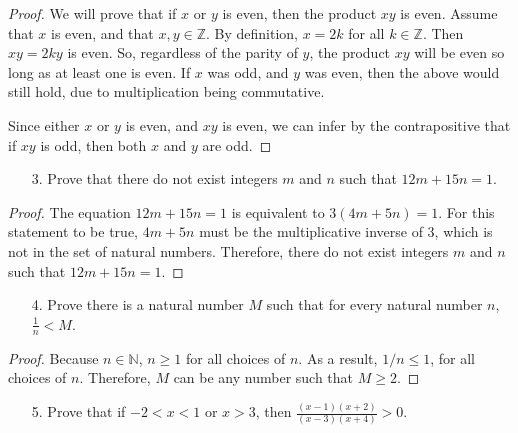 \documentclass[10pt]{article}
\theoremstyle{definition}
\theoremstyle{plain}
\newcommand{\N}{\mathbb{N}}
\newcommand{\Z}{\mathbb{Z}}
\begin{document}
\begin{proof}
  We will prove that if $x$ or $y$ is even, then the product $xy$ is even. Assume that $x$ is even, and that $x,y\in\Z$. By definition, $x=2k$ for all $k\in\Z$. Then $xy=2ky$ is even. So, regardless of the parity of $y$, the product $xy$ will be even so long as at least one is even. If $x$ was odd, and $y$ was even, then the above would still hold, due to multiplication being commutative. \\

  \par Since either $x$ or $y$ is even, and $xy$ is even, we can infer by the contrapositive that if $xy$ is odd, then both $x$ and $y$ are odd.
\end{proof}



\pagebreak



\begin{enumerate}
  \item[3.] Prove that there do not exist integers $m$ and $n$ such that $12m + 15n = 1$.
\end{enumerate}

\begin{proof}
  The equation $12m + 15n = 1$ is equivalent to $3(4m+5n)=1$. For this statement to be true, $4m+5n$ must be the multiplicative inverse of $3$, which is not in the set of natural numbers. Therefore, there do not exist integers $m$ and $n$ such that $12m + 15n = 1$.
\end{proof}



\pagebreak



\begin{enumerate}
  \item[4.] Prove there is a natural number $M$ such that for every natural number $n$, $\frac{1}{n} < M$.
\end{enumerate}

\begin{proof}
  Because $n\in\N$, $n\geq 1$ for all choices of $n$. As a result, $1/n \leq 1$, for all choices of $n$. Therefore, $M$ can be any number such that $M\geq 2$.
\end{proof}



\pagebreak



\begin{enumerate}
  \item[5.] Prove that if $-2 < x < 1$ or $x > 3$, then $\frac{(x-1)(x+2)}{(x-3)(x+4)} > 0$.
\end{enumerate}
\end{document}
